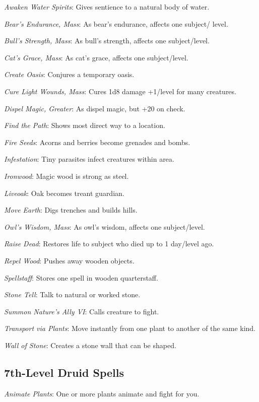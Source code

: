 \textit{Awaken Water Spirits}: Gives sentience to a natural body of water.

\textit{Bear's Endurance, Mass}: As bear's endurance, affects one subject/ level.

\textit{Bull's Strength, Mass}: As bull's strength, affects one subject/level.

\textit{Cat's Grace, Mass}: As cat's grace, affects one subject/level.

\textit{Create Oasis}: Conjures a temporary oasis.

\textit{Cure Light Wounds, Mass}: Cures 1d8 damage +1/level for many creatures.

\textit{Dispel Magic, Greater}: As dispel magic, but +20 on check.

\textit{Find the Path}: Shows most direct way to a location.

\textit{Fire Seeds}: Acorns and berries become grenades and bombs.

\textit{Infestation}: Tiny parasites infect creatures within area.

\textit{Ironwood}: Magic wood is strong as steel.

\textit{Liveoak}: Oak becomes treant guardian.

\textit{Move Earth}: Digs trenches and builds hills.

\textit{Owl's Wisdom, Mass}: As owl's wisdom, affects one subject/level.

\textit{Raise Dead}: Restores life to subject who died up to 1 day/level ago.

\textit{Repel Wood}: Pushes away wooden objects.

\textit{Spellstaff}: Stores one spell in wooden quarterstaff.

\textit{Stone Tell}: Talk to natural or worked stone.

\textit{Summon Nature's Ally VI}: Calls creature to fight.

\textit{Transport via Plants}: Move instantly from one plant to another of the same kind.

\textit{Wall of Stone}: Creates a stone wall that can be shaped.



\subsection{7th-Level Druid Spells}

\textit{Animate Plants}: One or more plants animate and fight for you.

